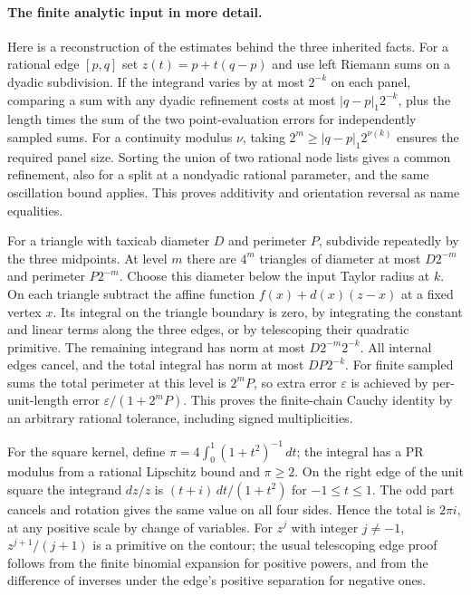 \paragraph{The finite analytic input in more detail.}
Here is a reconstruction of the estimates behind the three inherited facts. For a rational edge $[p,q]$ set $z(t)=p+t(q-p)$ and use left Riemann sums on a dyadic subdivision. If the integrand varies by at most $2^{-k}$ on each panel, comparing a sum with any dyadic refinement costs at most $|q-p|_1 2^{-k}$, plus the length times the sum of the two point-evaluation errors for independently sampled sums. For a continuity modulus $\nu$, taking $2^m\ge |q-p|_1 2^{\nu(k)}$ ensures the required panel size. Sorting the union of two rational node lists gives a common refinement, also for a split at a nondyadic rational parameter, and the same oscillation bound applies. This proves additivity and orientation reversal as name equalities.

For a triangle with taxicab diameter $D$ and perimeter $P$, subdivide repeatedly by the three midpoints. At level $m$ there are $4^m$ triangles of diameter at most $D2^{-m}$ and perimeter $P2^{-m}$. Choose this diameter below the input Taylor radius at $k$. On each triangle subtract the affine function $f(x)+d(x)(z-x)$ at a fixed vertex $x$. Its integral on the triangle boundary is zero, by integrating the constant and linear terms along the three edges, or by telescoping their quadratic primitive. The remaining integrand has norm at most $D2^{-m}2^{-k}$. All internal edges cancel, and the total integral has norm at most $DP2^{-k}$. For finite sampled sums the total perimeter at this level is $2^mP$, so extra error $\varepsilon$ is achieved by per-unit-length error $\varepsilon/(1+2^mP)$. This proves the finite-chain Cauchy identity by an arbitrary rational tolerance, including signed multiplicities.

For the square kernel, define $\pi=4\int_0^1(1+t^2)^{-1}\,dt$; the integral has a PR modulus from a rational Lipschitz bound and $\pi\ge2$. On the right edge of the unit square the integrand $dz/z$ is $(t+i)\,dt/(1+t^2)$ for $-1\le t\le1$. The odd part cancels and rotation gives the same value on all four sides. Hence the total is $2\pi i$, at any positive scale by change of variables. For $z^j$ with integer $j\ne-1$, $z^{j+1}/(j+1)$ is a primitive on the contour; the usual telescoping edge proof follows from the finite binomial expansion for positive powers, and from the difference of inverses under the edge's positive separation for negative ones.

